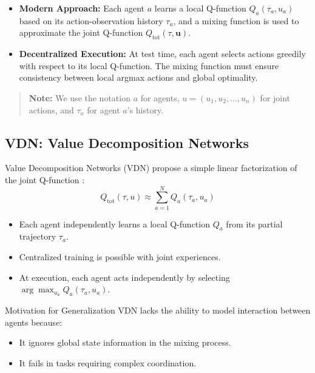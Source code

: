 \documentclass[../Main.tex]{subfiles}
\begin{document}
\begin{itemize}
    \item \textbf{Modern Approach:} Each agent \(a\) learns a local Q-function \(Q_a(\tau_a, u_a)\) based on its action-observation history \(\tau_a\), and a mixing function is used to approximate the joint Q-function \(Q_{\text{tot}}(\tau, \mathbf{u})\).
    \item \textbf{Decentralized Execution:} At test time, each agent selects actions greedily with respect to its local Q-function. The mixing function must ensure consistency between local argmax actions and global optimality.
\end{itemize}

\begin{quote}
\textbf{Note:} We use the notation \( a \) for agents, \( u = (u_1, u_2, \dots, u_n) \) for joint actions, and \( \tau_a \) for agent \(a\)'s history.
\end{quote}

\subsection{VDN: Value Decomposition Networks}

Value Decomposition Networks (VDN) propose a simple linear factorization of the joint Q-function \cite{sunehag2017value}:
\[
Q_{\text{tot}}(\tau, u) \approx \sum_{a=1}^{N} Q_a(\tau_a, u_a)
\]
\begin{itemize}
    \item Each agent independently learns a local Q-function \(Q_a\) from its partial trajectory \(\tau_a\).
    \item Centralized training is possible with joint experiences.
    \item At execution, each agent acts independently by selecting \( \arg\max_{u_a} Q_a(\tau_a, u_a) \).
\end{itemize}

\begin{exampleblock}{Motivation for Generalization}
    VDN lacks the ability to model interaction between agents because:
    \begin{itemize}
        \item It ignores global state information in the mixing process.
        \item It fails in tasks requiring complex coordination.
    \end{itemize}
\end{exampleblock}
\end{document}
